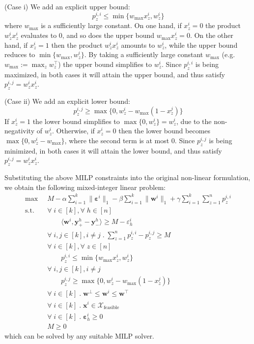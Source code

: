 \documentclass{article}
\renewcommand\[{\begin{equation}}
\renewcommand\]{\end{equation}}
\newcommand{\calvar}[1]{\ensuremath{\mathcal{#1}}}
\newcommand{\calX}{\calvar{X}}
\newcommand{\vecvar}[1]{\ensuremath{\boldsymbol{#1}}}
\newcommand{\vw}{\vecvar{w}}
\newcommand{\vx}{\vecvar{x}}
\newcommand{\vy}{\vecvar{y}}
\newcommand{\veps}{\vecvar{\varepsilon}}
\begin{document}
(Case i) We add an explicit upper bound:
%
$$ p^{i,i}_z \le \min \{ w_\text{max} x^{i}_z, w^{i}_z \} $$
%
where $w_\text{max}$ is a sufficiently large constant.
On one hand, if $x^i_z = 0$ the product $w^i_z x^i_z$ evaluates to $0$, and so does
the upper bound $w_\text{max} x^{i}_z = 0$. On the other hand, if $x^i_z=1$
then the product $w^i_z x^i_z$ amounts to $w^i_z$, while the upper
bound reduces to $\min \{ w_\text{max}, w^{i}_z \}$. By taking a sufficiently
large constant $w_\text{max}$ (e.g. $w_\text{max} := \max_z w^\top_z$) the
upper bound simplifies to $w^i_z$. Since $p^{i,i}_z$ is being maximized, in
both cases it will attain the upper bound, and thus satisfy $p^{i,j}_z = w^i_z x^i_z$.

(Case ii) We add an explicit lower bound:
%
$$ p^{i,j}_z \ge \max \{ 0, w^{i}_z - w_\text{max}(1 - x^{j}_z) \} $$
%
If $x^i_z = 1$ the lower bound simplifies to $\max \{ 0, w^{i}_z \} = w^{i}_z$,
due to the non-negativity of $w^i_z$. Otherwise, if $x^i_z = 0$
then the lower bound becomes $\max \{ 0, w^{i}_z - w_\text{max} \}$, where
the second term is at most $0$. Since $p^{i,j}_z$ is being minimized, in both
cases it will attain the lower bound, and thus satisfy $p^{i,j}_z = w^i_z x^i_z$.

Substituting the above MILP constraints into the original non-linear
formulation, we obtain the following mixed-integer linear problem:
%
{\footnotesize
\begin{align}
    \max
        & \;\; M - \alpha \sum_{i=1}^k \| \veps^{i} \|_1 - \beta \sum_{i=1}^k \| \vw^{i} \|_1 + \gamma \sum_{i=1}^k \sum_{z=1}^n p^{i,i}_z
        \nonumber
    \\
    \text{s.t.}
        & \;\; \forall \; i \in [k], \forall \; h \in [n] \nonumber
    \\
        & \;\; \qquad \langle \vw^{i}, \vy^{h}_+ - \vy^{h}_- \rangle \ge M - \varepsilon^{i}_h \nonumber
    \\
        & \;\; \forall \; i, j \in [k], i \neq j \;.\; \sum_{z=1}^n p^{i,i}_z - p^{i,j}_z \ge M
    \\
        & \;\; \forall \; i \in [k], \forall \; z \in [n] \nonumber
    \\
        & \;\; \qquad p^{i,i}_z \le \min \{ w_\text{max} x^{i}_z, w^{i}_z \}
    \\
        & \;\; \forall \; i, j \in [k], i \neq j \nonumber
    \\
        & \;\; \qquad p^{i,j}_z \ge \max \{ 0, w^{i}_z - w_\text{max}(1 - x^{j}_z) \}
    \\
        & \;\; \forall \; i \in [k] \;.\; \vw^\bot \le \vw^{i} \le \vw^\top \label{eq:wbounds2}
    \\
        & \;\; \forall \; i \in [k] \;.\; \vx^{i} \in \calX_{\text{feasible}} \nonumber
    \\
        & \;\; \forall \; i \in [k] \;.\; \veps^{i}_h \ge 0 \nonumber
    \\
        & \;\; M \ge 0 \nonumber
\end{align}
}
%
which can be solved by any suitable MILP solver.
\end{document}
